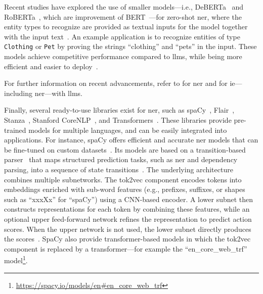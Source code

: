 Recent studies have explored the use of smaller models---i.e., DeBERTa~\cite{HeGChen2023} and RoBERTa~\cite{liu2020roberta}, which are improvement of BERT~\cite{devlin-etal-2019-bert}---for zero-shot \ac{ner}, where the entity types to recognize are provided as textual inputs for the model together with the input text~\cite{zaratiana-etal-2024-gliner,bogdanov-etal-2024-nuner}. An example application is to recognize entities of type \texttt{Clothing} or \texttt{Pet} by proving the strings ``clothing'' and ``pets'' in the input. These models achieve competitive performance compared to \acp{llm}, while being more efficient and easier to deploy~\cite{zaratiana-etal-2024-gliner,bogdanov-etal-2024-nuner}.


For further information on recent advancements, refer to \textcite{keraghel2024recentadvancesnamedentity} for \ac{ner} and \textcite{xu2024llm_for_ie} for \ac{ie}---including \ac{ner}---with \acp{llm}.


Finally, several ready-to-use libraries exist for \ac{ner}, such as spaCy~\cite{honnibal2020spacy}, Flair~\cite{akbik2019flair}, Stanza~\cite{qi2020stanza}, Stanford CoreNLP~\cite{manning-EtAl:2014:P14-5}, and Transformers~\cite{wolf-etal-2020-transformers}. These libraries provide pre-trained models for multiple languages, and can be easily integrated into applications. For instance, spaCy offers efficient and accurate \ac{ner} models that can be fine-tuned on custom datasets~\cite{honnibal2020spacy}. Its models are based on a transition-based parser~\cite{AliEtAl2023UnintendedMemorization} that maps structured prediction tasks, such as \ac{ner} and dependency parsing, into a sequence of state transitions~\cite{lample-etal-2016-neural}. The underlying architecture combines multiple subnetworks. The tok2vec component encodes tokens into embeddings enriched with sub-word features (e.g., prefixes, suffixes, or shapes such as ``xxxXx'' for ``spaCy'') using a CNN-based encoder. A lower subnet then constructs representations for each token by combining these features, while an optional upper feed-forward network refines the representation to predict action scores. When the upper network is not used, the lower subnet directly produces the scores~\cite{AliEtAl2023UnintendedMemorization}. SpaCy also provide transformer-based models in which the tok2vec component is replaced by a transformer---for example the ``en\_core\_web\_trf'' model\footnote{\url{https://spacy.io/models/en\#en\_core\_web\_trf}}.




